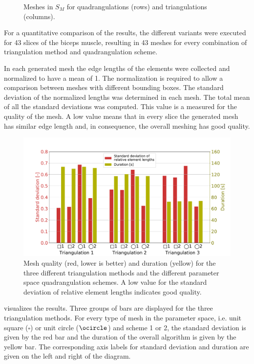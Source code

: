 \begin{figure}
\begin{subfigure}[t]{0.24\textwidth}
    \label{fig:tri_23}%
  \end{subfigure}
  \caption{Meshes in $S_M$ for quadrangulations (rows) and triangulations (columns).}%
  \label{fig:tri_meshes}%
\end{figure}%

For a quantitative comparison of the results, the different variants were executed for 43 slices of the biceps muscle, resulting in 43 meshes for every combination of triangulation method and quadrangulation scheme.

In each generated mesh the edge lengths of the elements were collected and normalized to have a mean of 1. The normalization is required to allow a comparison between meshes with different bounding boxes.
The standard deviation of the normalized lengths was determined in each mesh. The total mean of all the standard deviations was computed. This value is a measured for the quality of the mesh. A low value means that in every slice the generated mesh has similar edge length and, in consequence, the overall meshing has good quality.

\begin{figure}%
  \centering%
  \includegraphics[width=\textwidth]{images/fiber_creation/mesh_quality.pdf}%
  \caption{Mesh quality (red, lower is better) and duration (yellow) for the three different triangulation methods and the different parameter space quadrangulation schemes. A low value for the standard deviation of relative element lengths indicates good quality.}%
  \label{fig:mesh_quality}%
\end{figure}

 visualizes the results. Three groups of bars are displayed for the three triangulation methods. For every type of mesh in the parameter space, i.e. unit square ($\square$) or unit circle ($\ocircle$) and scheme 1 or 2, the standard deviation is given by the red bar and the duration of the overall algorithm is given by the yellow bar. The corresponding axis labels for standard deviation and duration are given on the left and right of the diagram.

